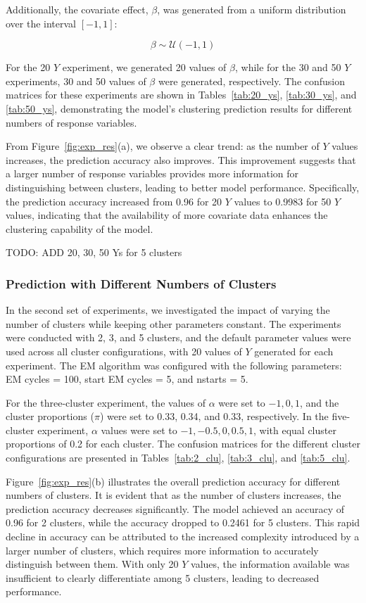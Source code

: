 \documentclass{article}
\begin{document}
Additionally, the covariate effect, \(\beta\), was generated from a uniform distribution over the interval \([-1, 1]\):

\[
\beta \sim \mathcal{U}(-1, 1)
\]

For the 20 \( Y \) experiment, we generated 20 values of \(\beta\), while for the 30 and 50 \( Y \) experiments, 30 and 50 values of \(\beta\) were generated, respectively. 
The confusion matrices for these experiments are shown in Tables~\ref{tab:20_ys}, \ref{tab:30_ys}, and \ref{tab:50_ys}, demonstrating the model's clustering prediction results for different numbers of response variables.

From Figure~\ref{fig:exp_res}(a), we observe a clear trend: as the number of \( Y \) values increases, the prediction accuracy also improves. 
This improvement suggests that a larger number of response variables provides more information for distinguishing between clusters, leading to better model performance. 
Specifically, the prediction accuracy increased from 0.96 for 20 \( Y \) values to 0.9983 for 50 \( Y \) values, indicating that the availability of more covariate data enhances the clustering capability of the model.

TODO: ADD 20, 30, 50 Ys for 5 clusters

\subsubsection*{Prediction with Different Numbers of Clusters}

In the second set of experiments, we investigated the impact of varying the number of clusters while keeping other parameters constant. 
The experiments were conducted with 2, 3, and 5 clusters, and the default parameter values were used across all cluster configurations, with 20 values of \( Y \) generated for each experiment. 
The EM algorithm was configured with the following parameters: EM cycles = 100, start EM cycles = 5, and nstarts = 5.

For the three-cluster experiment, the values of \(\alpha\) were set to \(-1, 0, 1\), and the cluster proportions (\(\pi\)) were set to 0.33, 0.34, and 0.33, respectively. 
In the five-cluster experiment, \(\alpha\) values were set to \(-1, -0.5, 0, 0.5, 1\), with equal cluster proportions of 0.2 for each cluster. 
The confusion matrices for the different cluster configurations are presented in Tables~\ref{tab:2_clu}, \ref{tab:3_clu}, and \ref{tab:5_clu}.

Figure~\ref{fig:exp_res}(b) illustrates the overall prediction accuracy for different numbers of clusters. 
It is evident that as the number of clusters increases, the prediction accuracy decreases significantly. 
The model achieved an accuracy of 0.96 for 2 clusters, while the accuracy dropped to 0.2461 for 5 clusters. 
This rapid decline in accuracy can be attributed to the increased complexity introduced by a larger number of clusters, which requires more information to accurately distinguish between them. 
With only 20 \( Y \) values, the information available was insufficient to clearly differentiate among 5 clusters, leading to decreased performance.
\end{document}

